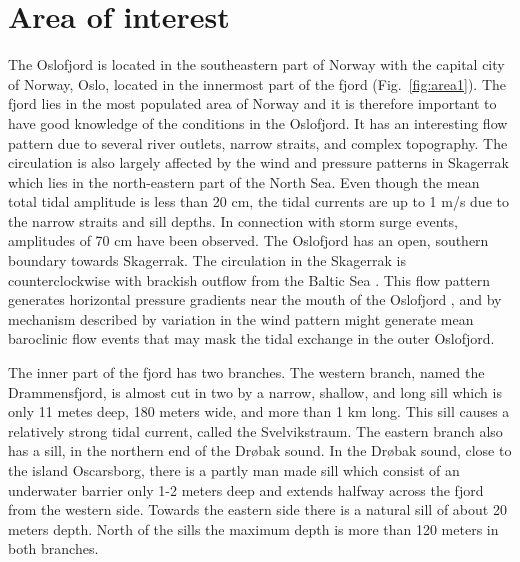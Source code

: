 \section{Area of interest}

The Oslofjord is located in the southeastern part of Norway with the capital city of Norway, Oslo, located in the innermost part of the fjord (Fig.~\ref{fig:area1}). The fjord lies in the most populated area of Norway and it is therefore important to have good knowledge of the conditions in the Oslofjord. It has an interesting flow pattern due to several river outlets, narrow straits, and complex topography. The circulation is also largely affected by the wind and pressure patterns in Skagerrak which lies in the north-eastern part of the North Sea. 
Even though the mean total tidal amplitude is less than 20 cm, the tidal currents are up to 1 m/s due to the narrow straits and sill depths. In connection with storm surge events, amplitudes of 70 cm have been observed. The Oslofjord has an open, southern boundary towards Skagerrak. The circulation in the Skagerrak is counterclockwise with brackish outflow from the Baltic Sea \cite[]{rodhe96,svendsen96}. This flow pattern generates horizontal pressure gradients near the mouth of the Oslofjord \cite[]{baals90}, and by mechanism described by \cite{klinck81} variation in the wind pattern might generate mean baroclinic flow events that may mask the tidal exchange in the outer Oslofjord.

The inner part of the fjord has two branches. The western branch, named the Drammensfjord, is almost cut in two by a narrow, shallow, and long sill which is only 11 metes deep, 180 meters wide, and more than 1 km long. This sill causes a relatively strong tidal current, called the Svelvikstraum. The eastern branch also has a sill, in the northern end of the Dr{\o}bak sound. In the Dr{\o}bak sound, close to the island Oscarsborg, there is a partly man made sill which consist of an underwater barrier only 1-2 meters deep and extends halfway across the fjord from the western side. Towards the eastern side there is a natural sill of about 20 meters depth. North of the sills the maximum depth is more than 120 meters in both branches. 

